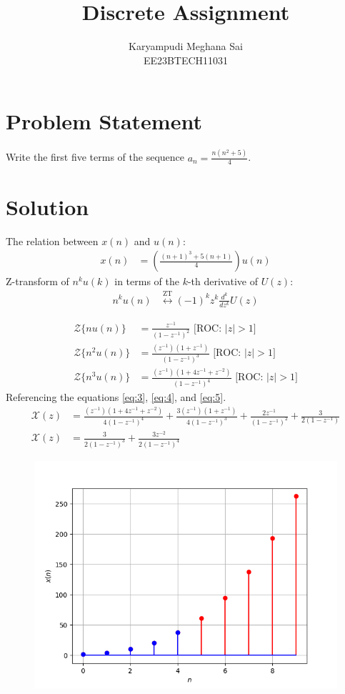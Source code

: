 \documentclass{article}
\newcommand{\system}[1]{\mathcal{Z}\{#1\}}
\begin{document}
\title{Discrete Assignment}
\author{Karyampudi Meghana Sai\\ EE23BTECH11031}
\maketitle

\section*{Problem Statement}
Write the first five terms of the sequence \(a_n = \frac{n(n^2+5)}{4}\).

\section*{Solution}
The relation between \(x(n)\) and \(u(n)\):
\begin{align}
 x(n) &= \left(\frac{(n+1)^3+5(n+1)}{4}\right) u(n)\label{eq:1}
\end{align}
Z-transform of \(n^ku(k)\) in terms of the \(k\)-th derivative of \(U(z)\):
\begin{align}
n^k u(n) &\overset{\text{ZT}}{\longleftrightarrow} (-1)^k z^k \frac{d^k}{dz^k}U(z)
\end{align}

\begin{align}
    \system{nu(n)} &= \frac{z^{-1}}{(1 - z^{-1})^2} \label{eq:3} \text{ [ROC: } \lvert z \rvert > 1\text{]} \\
    \system{n^2u(n)} &= \frac{(z^{-1})(1+z^{-1})}{(1 - z^{-1})^3} \label{eq:4} \text{ [ROC: } \lvert z \rvert > 1\text{]} \\
    \system{n^3u(n)} &= \frac{(z^{-1})(1+4z^{-1}+z^{-2})}{(1 - z^{-1})^4} \label{eq:5} \text{ [ROC: } \lvert z \rvert > 1\text{]}
\end{align}
Referencing the equations \eqref{eq:3}, \eqref{eq:4}, and \eqref{eq:5}.
\begin{align}
    \mathcal{X}(z) &= \frac{(z^{-1})(1+4z^{-1}+z^{-2})}{4(1-z^{-1})^4} + \frac{3(z^{-1})(1+z^{-1})}{4(1-z^{-1})^3} + \frac{2z^{-1}}{(1 - z^{-1})^2} + \frac{3}{2(1- z^{-1})} \\
    \mathcal{X}(z) &= \frac{3}{2(1-z^{-1})^3} + \frac{3z^{-2}}{2(1-z^{-1})^4}
\end{align}

\newpage
\begin{figure}
    \centering
    \includegraphics{figs/plot.png}
    \label{fig:your_label}
\end{figure}
\end{document}
